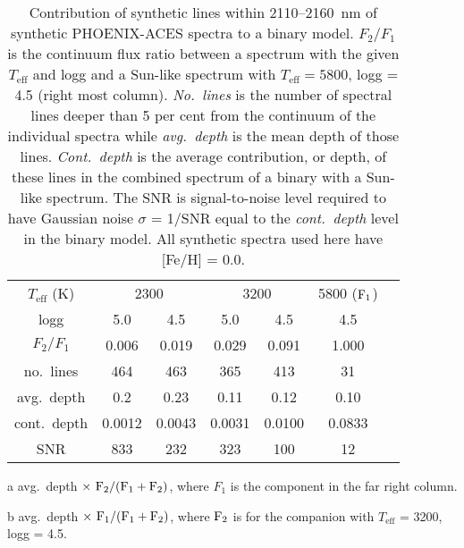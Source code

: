 \begin{table}
    \small
    \centering
    \begin{threeparttable}[b]

   \caption{Contribution of synthetic lines within 2110--2160~nm of synthetic PHOENIX-ACES spectra to a binary model. \(F_{2}/F_{1}\) is the continuum flux ratio between a spectrum with the given \(T_{\textrm{eff}}\) and logg and a Sun-like spectrum with \(T_{\textrm{eff}}=5800\), logg = 4.5 (right most column). \emph{No.\ lines} is the number of spectral lines deeper than 5 per cent from the continuum of the individual spectra while \emph{avg.\ depth} is the mean depth of those lines. \emph{Cont.\ depth} is the average contribution, or depth, of these lines in the combined spectrum of a binary with a Sun-like spectrum. The SNR is signal-to-noise level required to have Gaussian noise \(\sigma\) = 1/SNR equal to the \emph{cont.\ depth} level in the binary model. All synthetic spectra used here have [Fe/H] = 0.0.}

    \begin{tabular}{*7c}
        \toprule
        \(T_{\textrm{eff}}\) (K)  & \multicolumn{2}{c}{2300} & \multicolumn{2}{c}{3200} & 5800 (\(\rm F_1\))\\
        logg & 5.0 & 4.5  & 5.0 & 4.5 & 4.5 \\
        \midrule
        \(F_2/F_1\) & 0.006 & 0.019 & 0.029  & 0.091 & 1.000 \\
        no.\ lines & 464 & 463 & 365  & 413 & 31 \\
        avg.\ depth & 0.2  & 0.23& 0.11 & 0.12 & 0.10 \\
        cont.\ depth\tnote{a} &  0.0012 & 0.0043 &  0.0031 & 0.0100&  0.0833\tnote{b} \\
        SNR  & 833 & 232 & 323  & 100 & 12 \\
        \bottomrule
    \end{tabular}\label{tab:line_contributions}
    \begin{tablenotes}
        \item [a] avg.\ depth \(\times~ \rm F_2 / (F_1 + F_2)\), where \(F_1\) is the component in the far right column.
        \item[b] avg.\ depth \(\times~ \rm F_1 / (F_1 + F_2)\), where \(\rm F_2\) is for the companion with \(T_{\textrm{eff}}\) = 3200, logg = 4.5.
    \end{tablenotes}
  \end{threeparttable}
\end{table}
